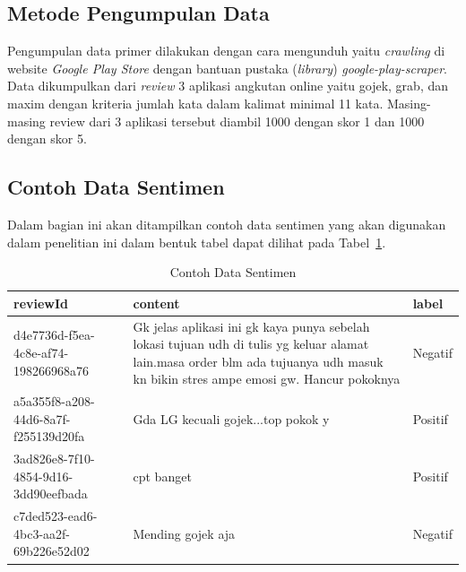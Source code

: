 \subsection{Metode Pengumpulan Data}
Pengumpulan data primer dilakukan dengan cara mengunduh yaitu \emph{crawling} di website
\emph{Google Play Store} dengan bantuan pustaka (\emph{library}) \emph{google-play-scraper}. Data
dikumpulkan dari \emph{review} 3 aplikasi angkutan online yaitu gojek, grab, dan maxim dengan kriteria
jumlah kata dalam kalimat minimal 11 kata. Masing-masing review dari 3 aplikasi tersebut diambil
1000 dengan skor 1 dan 1000 dengan skor 5.

\subsection{Contoh Data Sentimen}
Dalam bagian ini akan ditampilkan contoh data sentimen yang akan digunakan dalam penelitian ini
dalam bentuk tabel dapat dilihat pada Tabel~\ref{tab:contoh_data_sentimen}.

\begin{table}[H]
  \centering
  \caption{Contoh Data Sentimen}
  \label{tab:contoh_data_sentimen}
  \begin{tabularx}{\columnwidth}{|X|X|l|}
    \hline
    reviewId                             & content                                                                                                                                                                          & label   \\ \hline
    d4e7736d-f5ea-4c8e-af74-198266968a76 & Gk jelas aplikasi ini gk kaya punya sebelah lokasi tujuan udh di tulis yg keluar alamat lain.masa order blm ada tujuanya udh masuk kn bikin stres ampe emosi gw. Hancur pokoknya & Negatif \\ \hline
    a5a355f8-a208-44d6-8a7f-f255139d20fa & Gda LG kecuali gojek...top pokok y                                                                                                                                               & Positif \\ \hline
    3ad826e8-7f10-4854-9d16-3dd90eefbada & cpt banget                                                                                                                                                                       & Positif \\ \hline
    c7ded523-ead6-4bc3-aa2f-69b226e52d02 & Mending gojek aja                                                                                                                                                                & Negatif \\ \hline
  \end{tabularx}
\end{table}

